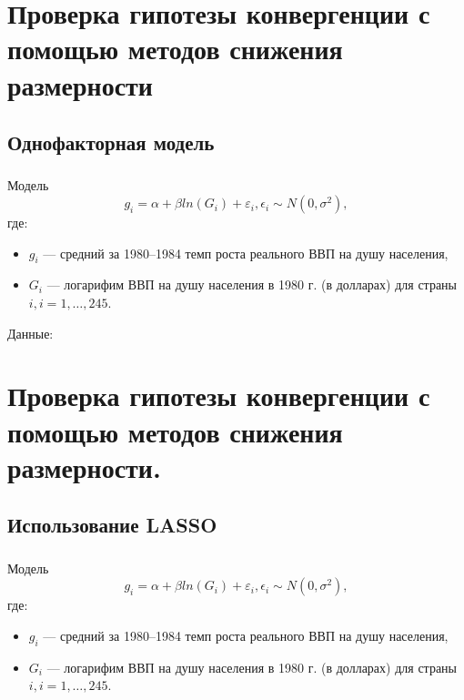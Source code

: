 \documentclass[c, dvipsnames]{beamer}  %
\begin{document}
\section{Проверка гипотезы конвергенции с помощью методов снижения размерности}
\subsection{Однофакторная модель}
\begin{frame}
\frametitle{\insertsection} 
\framesubtitle{\insertsubsection}
    \begin{block}{Модель}
    \begin{equation}
g_i = \alpha +\beta ln(G_i) + \varepsilon_i, \epsilon_i \sim N(0, \sigma^2),
\end{equation}
где:
\begin{itemize}
    \item $g_i$ --- средний за 1980--1984 темп роста реального ВВП на душу населения, 
    \item $G_i$ --- логарифим ВВП на душу населения в 1980 г. (в долларах) для страны $i, i =1, \dots, 245$.
\end{itemize}
    \end{block}
    Данные:
    
\end{frame}


\section{Проверка гипотезы конвергенции с помощью методов снижения размерности.}
\subsection{Использование LASSO}
\begin{frame}
\frametitle{\insertsection} 
\framesubtitle{\insertsubsection}
    \begin{block}{Модель}
    \begin{equation}
g_i = \alpha +\beta ln(G_i) + \varepsilon_i, \epsilon_i \sim N(0, \sigma^2),
\end{equation}
где:
\begin{itemize}
    \item $g_i$ --- средний за 1980--1984 темп роста реального ВВП на душу населения, 
    \item $G_i$ --- логарифим ВВП на душу населения в 1980 г. (в долларах) для страны $i, i =1, \dots, 245$.
\end{itemize}
    \end{block}
    
    
\end{frame}
\end{document}
